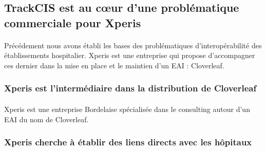 	\subsection{TrackCIS est au cœur d'une problématique commerciale pour Xperis}
		\paragraph{}
		Précédement nous avons établi les bases des problématiques d'interopérabilité
		des établissements hospitalier. Xperis est une entreprise qui propose
		d'accompagner ces dernier dans la mise en place et le maintien d'un EAI :
		Cloverleaf.
		
		\subsubsection{Xperis est l'intermédiaire dans la distribution de Cloverleaf}
			\paragraph{}%
			Xperis est une entreprise Bordelaise spécialisée dans le
			consulting autour d'un EAI du nom de Cloverleaf.
			
			\paragraph{}%
			
			\paragraph{}%
			
		\subsubsection{Xperis cherche à établir des liens directs avec les hôpitaux}
